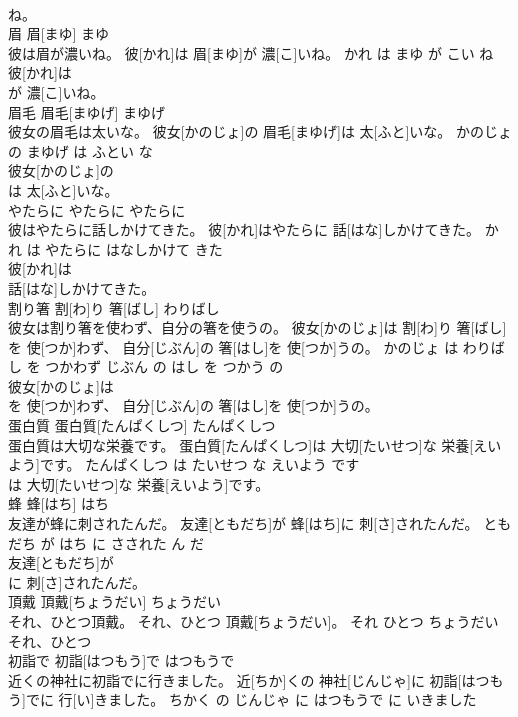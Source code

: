 \documentclass[8pt]{extreport}
\begin{document}
\begin{CJK}{UTF8}{min}
\\	ね。			
\\	眉	眉[まゆ]	まゆ	
\\	彼は眉が濃いね。	彼[かれ]は 眉[まゆ]が 濃[こ]いね。	かれ は まゆ が こい ね	
\\	彼[かれ]は
\\	が 濃[こ]いね。			
\\	眉毛	眉毛[まゆげ]	まゆげ	
\\	彼女の眉毛は太いな。	彼女[かのじょ]の 眉毛[まゆげ]は 太[ふと]いな。	かのじょ の まゆげ は ふとい な	
\\	彼女[かのじょ]の
\\	は 太[ふと]いな。			
\\	やたらに	やたらに	やたらに	
\\	彼はやたらに話しかけてきた。	彼[かれ]はやたらに 話[はな]しかけてきた。	かれ は やたらに はなしかけて きた	
\\	彼[かれ]は
\\	話[はな]しかけてきた。			
\\	割り箸	割[わ]り 箸[ばし]	わりばし	
\\	彼女は割り箸を使わず、自分の箸を使うの。	彼女[かのじょ]は 割[わ]り 箸[ばし]を 使[つか]わず、 自分[じぶん]の 箸[はし]を 使[つか]うの。	かのじょ は わりばし を つかわず じぶん の はし を つかう の	
\\	彼女[かのじょ]は
\\	を 使[つか]わず、 自分[じぶん]の 箸[はし]を 使[つか]うの。			
\\	蛋白質	蛋白質[たんぱくしつ]	たんぱくしつ	
\\	蛋白質は大切な栄養です。	蛋白質[たんぱくしつ]は 大切[たいせつ]な 栄養[えいよう]です。	たんぱくしつ は たいせつ な えいよう です	
\\	は 大切[たいせつ]な 栄養[えいよう]です。			
\\	蜂	蜂[はち]	はち	
\\	友達が蜂に刺されたんだ。	友達[ともだち]が 蜂[はち]に 刺[さ]されたんだ。	ともだち が はち に さされた ん だ	
\\	友達[ともだち]が
\\	に 刺[さ]されたんだ。			
\\	頂戴	頂戴[ちょうだい]	ちょうだい	
\\	それ、ひとつ頂戴。	それ、ひとつ 頂戴[ちょうだい]。	それ ひとつ ちょうだい	
\\	それ、ひとつ
\\	初詣で	初詣[はつもう]で	はつもうで	
\\	近くの神社に初詣でに行きました。	近[ちか]くの 神社[じんじゃ]に 初詣[はつもう]でに 行[い]きました。	ちかく の じんじゃ に はつもうで に いきました	

\end{CJK}
\end{document}
